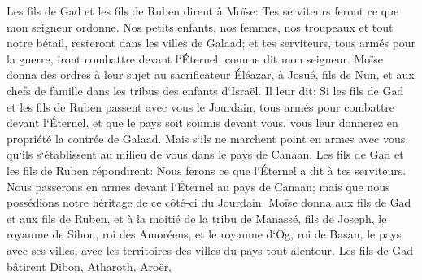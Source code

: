\verse Les fils de Gad et les fils de Ruben dirent à Moïse: Tes serviteurs feront ce que mon seigneur ordonne. 
\verse Nos petits enfants, nos femmes, nos troupeaux et tout notre bétail, resteront dans les villes de Galaad; 
\verse et tes serviteurs, tous armés pour la guerre, iront combattre devant l`Éternel, comme dit mon seigneur. 
\verse Moïse donna des ordres à leur sujet au sacrificateur Éléazar, à Josué, fils de Nun, et aux chefs de famille dans les tribus des enfants d`Israël. 
\verse Il leur dit: Si les fils de Gad et les fils de Ruben passent avec vous le Jourdain, tous armés pour combattre devant l`Éternel, et que le pays soit soumis devant vous, vous leur donnerez en propriété la contrée de Galaad. 
\verse Mais s`ils ne marchent point en armes avec vous, qu`ils s`établissent au milieu de vous dans le pays de Canaan. 
\verse Les fils de Gad et les fils de Ruben répondirent: Nous ferons ce que l`Éternel a dit à tes serviteurs. 
\verse Nous passerons en armes devant l`Éternel au pays de Canaan; mais que nous possédions notre héritage de ce côté-ci du Jourdain. 
\verse Moïse donna aux fils de Gad et aux fils de Ruben, et à la moitié de la tribu de Manassé, fils de Joseph, le royaume de Sihon, roi des Amoréens, et le royaume d`Og, roi de Basan, le pays avec ses villes, avec les territoires des villes du pays tout alentour. 
\verse Les fils de Gad bâtirent Dibon, Atharoth, Aroër, 
